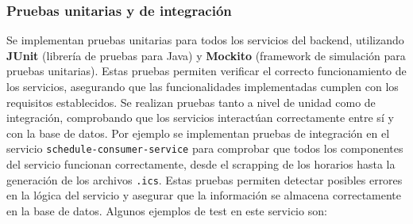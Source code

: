 \subsubsection{Pruebas unitarias y de integración}
Se implementan pruebas unitarias para todos los servicios del backend, utilizando \textbf{JUnit} (librería de pruebas para Java) y \textbf{Mockito} (framework de simulación para pruebas unitarias). Estas pruebas permiten verificar el correcto funcionamiento de los servicios, asegurando que las funcionalidades implementadas cumplen con los requisitos establecidos. Se realizan pruebas tanto a nivel de unidad como de integración, comprobando que los servicios interactúan correctamente entre sí y con la base de datos.
\newline
Por ejemplo se implementan pruebas de integración en el servicio \texttt{schedule-consumer-service} para comprobar que todos los componentes del servicio funcionan correctamente, desde el scrapping de los horarios hasta la generación de los archivos \texttt{.ics}. Estas pruebas permiten detectar posibles errores en la lógica del servicio y asegurar que la información se almacena correctamente en la base de datos.
\newline
Algunos ejemplos de test en este servicio son:
